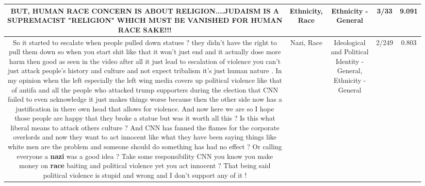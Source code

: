 \documentclass[11pt]{article}
\newlength\mylength
\begin{document}
\begin{center}
\begin{longtable}{|C{.65\mylength}|C{.30\mylength}|C{.12\mylength}|C{.12\mylength}|C{.12\mylength}|}
BUT, HUMAN \textbf{RACE} CONCERN IS ABOUT RELIGION....JUDAISM IS A SUPREMACIST "RELIGION" WHICH MUST BE VANISHED FOR HUMAN \textbf{RACE} SAKE!!!\normalsize   & Ethnicity, Race & Ethnicity - General & 3/33 & 9.091 \\  \hline
  \small So it started to escalate when people pulled down statues ? they didn't have the right to pull them down so when you start shit like that it won't just end and it actually dose more harm then good as seen in the video after all it just lead to escalation of violence you can't just attack people's history and culture and not expect tribalism it's just human nature . In my opinion when the left especially the left wing media covers up political violence like that of antifa and all the people who attacked trump supporters during the election that CNN failed to even acknowledge it just makes things worse because then the other side now has a justification in there own head that allows for violence. And now here we are  so I hope those people are happy that they broke a statue but was it worth all this ? Is this what liberal means to attack others culture ? And CNN has fanned the flames for the corporate overlords and now they want to act innocent like what they have been saying things like white men are the problem and someone should do something has had no effect ? Or calling everyone a \textbf{nazi} was a good idea ? Take some responsibility CNN you know you make money on \textbf{race} baiting and political violence yet you act innocent ? That being said political violence is stupid and wrong and I don't support any of it !\normalsize   & Nazi, Race &  Ideological and Political Identity - General, Ethnicity - General & 2/249 & 0.803 \\  \hline

\end{longtable}
\end{center}
\end{document}
